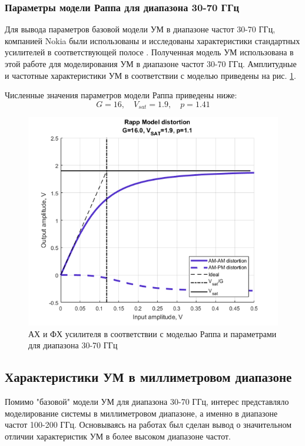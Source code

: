 \subsubsection{Параметры модели Раппа для диапазона 30-70 ГГц}
Для вывода параметров базовой модели УМ в диапазоне частот 30-70 ГГц,
компанией Nokia были использованы и исследованы характеристики стандартных
усилителей в соответствующей полосе \cite{nokia163314}. Полученная модель
УМ использована в этой работе для моделирования УМ в диапазоне частот 30-70
ГГц. Амплитудные и частотные характеристики УМ в соответствии с моделью
\cite{nokia163314} приведены на рис. \ref{fig:rapp_nokia}.

Численные значения параметров модели Раппа приведены ниже:
\begin{equation}
    G = 16, \quad V_{sat} = 1.9, \quad p = 1.41
\end{equation}

\begin{figure}[h!]
    \centering
    \includegraphics[width=0.7\linewidth]{figs/rapp_nokia.png}
    \caption{АХ и ФХ усилителя в соответствии с моделью Раппа и
    параметрами для диапазона 30-70 ГГц}
    \label{fig:rapp_nokia}
\end{figure}

\subsection{Характеристики УМ в миллиметровом диапазоне}
Помимо "базовой" модели УМ для диапазона 30-70 ГГц, интерес представляло
моделирование системы в миллиметровом диапазоне, а именно  в диапазоне
частот 100-200 ГГц. Основываясь на работах
\cite{zhang2021}\cite{amadorey2018}\cite{aliyun2020} был сделан вывод о
значительном отличии характеристик УМ в более высоком диапазоне частот.


